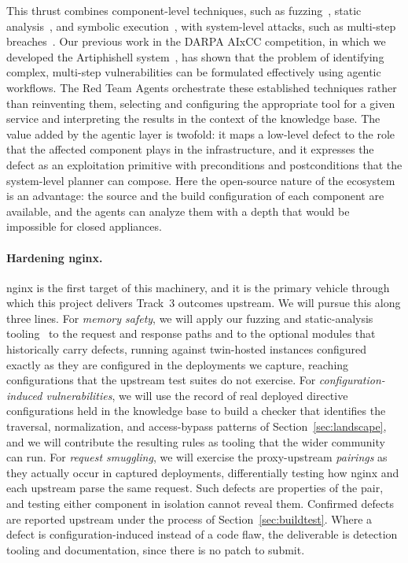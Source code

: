 This thrust combines component-level techniques, such as
fuzzing~\cite{fleischer23:actor,scharnowski22:fuzzware}, static
analysis~\cite{machiry17:drchecker}, and symbolic
execution~\cite{ruaro21:syml}, with system-level attacks, such as multi-step
breaches~\cite{redini20:karonte}. Our previous work in the DARPA AIxCC
competition, in which we developed the Artiphishell
system~\cite{artiphishell}, has shown that the problem of identifying
complex, multi-step vulnerabilities can be formulated effectively using
agentic workflows. The Red Team Agents orchestrate these established
techniques rather than reinventing them, selecting and configuring the
appropriate tool for a given service and interpreting the results in the
context of the knowledge base. The value added by the agentic layer is
twofold: it maps a low-level defect to the role that the affected component
plays in the infrastructure, and it expresses the defect as an exploitation
primitive with preconditions and postconditions that the system-level planner
can compose. Here the open-source nature of the ecosystem is an advantage: the source and
the build configuration of each component are available, and the agents can
analyze them with a depth that would be impossible for closed appliances.

\paragraph{Hardening nginx.}
nginx is the first target of this machinery, and it is the primary vehicle
through which this project delivers Track~3 outcomes upstream. We will pursue
this along three lines. For \emph{memory safety}, we will apply our fuzzing
and static-analysis tooling~\cite{fleischer23:actor,machiry17:drchecker} to
the request and response paths and to the optional modules that historically
carry defects, running against twin-hosted instances configured exactly as
they are configured in the deployments we capture, reaching configurations
that the upstream test suites do not exercise. For
\emph{configuration-induced vulnerabilities}, we will use the record of real
deployed directive configurations held in the knowledge base to build a
checker that identifies the traversal, normalization, and access-bypass
patterns of Section~\ref{sec:landscape}, and we will contribute the resulting
rules as tooling that the wider community can run. For \emph{request
smuggling}, we will exercise the proxy-upstream \emph{pairings} as they
actually occur in captured deployments, differentially testing how nginx and each upstream parse the same request.
Such defects are properties of the pair, and testing either component in
isolation cannot reveal them. Confirmed defects are reported upstream
under the process of Section~\ref{sec:buildtest}. Where a defect is configuration-induced instead of a code flaw, the
deliverable is detection tooling and documentation, since there is no patch to
submit.

